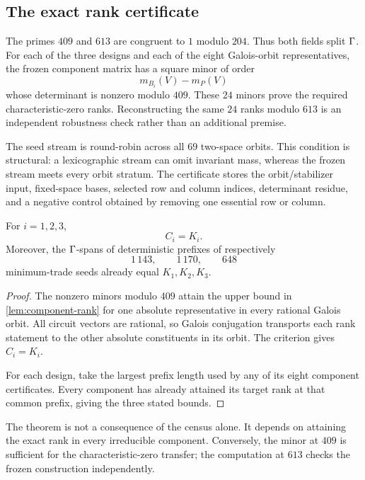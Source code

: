 \subsection{The exact rank certificate}

The primes \(409\) and \(613\) are congruent to \(1\) modulo \(204\).
Thus both fields split \(\Gamma\).  For each of the three designs and
each of the eight Galois-orbit representatives, the frozen component
matrix has a square minor of order
\[
 m_{B_i}(V)-m_P(V)
\]
whose determinant is nonzero modulo \(409\).  These \(24\) minors prove
the required characteristic-zero ranks.  Reconstructing the same
\(24\) ranks modulo \(613\) is an independent robustness check rather
than an additional premise.

The seed stream is round-robin across all \(69\) two-space orbits.  This
condition is structural: a lexicographic stream can omit invariant mass,
whereas the frozen stream meets every orbit stratum.  The certificate
stores the orbit/stabilizer input, fixed-space bases, selected row and
column indices, determinant residue, and a negative control obtained by
removing one essential row or column.

\begin{theorem}
\label{thm:full-kernel}
For \(i=1,2,3\),
\[
  C_i=K_i.
\]
Moreover, the \(\Gamma\)-spans of deterministic prefixes of respectively
\[
 1\,143,\qquad 1\,170,\qquad 648
\]
minimum-trade seeds already equal \(K_1,K_2,K_3\).
\end{theorem}

\begin{proof}
The nonzero minors modulo \(409\) attain the upper bound in
\cref{lem:component-rank} for one absolute representative in every
rational Galois orbit.  All circuit vectors are rational, so Galois
conjugation transports each rank statement to the other absolute
constituents in its orbit.  The criterion gives \(C_i=K_i\).

For each design, take the largest prefix length used by any of its eight
component certificates.  Every component has already attained its target
rank at that common prefix, giving the three stated bounds.
\end{proof}

\begin{remark}
The theorem is not a consequence of the census alone.  It depends on
attaining the exact rank in every irreducible component.  Conversely, the
minor at \(409\) is sufficient for the characteristic-zero transfer;
the computation at \(613\) checks the frozen construction independently.
\end{remark}
